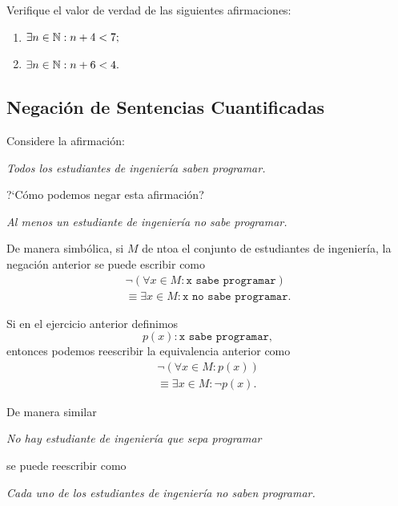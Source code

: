 \documentclass[xcolor={svgnames},
  hyperref={colorlinks}, 
  spanish, 12pt]{beamer}
\numberwithin{equation}{section} %
\numberwithin{figure}{section} %
\begin{document}
\begin{frame}
 Verifique el valor de verdad de las siguientes afirmaciones:
 \begin{enumerate}
  \item $\exists n  \in \mathbb{N}: n+4<7;$ \pause
  \item $\exists n \in \mathbb{N}: n+6<4.$
 \end{enumerate}

\end{frame}

\subsection{Negaci\'on de Sentencias Cuantificadas}


\begin{frame}
 Considere la afirmaci\'on:
 \begin{center}
  \emph{Todos los estudiantes de ingenier\'ia saben programar.}
 \end{center}
?`C\'omo podemos negar esta afirmaci\'on?
\pause

\begin{center}
 \emph{Al menos un estudiante de ingenier\'ia no sabe programar.}
\end{center} 
\end{frame}

\begin{frame}
 De manera simb\'olica, si $M$ de ntoa el conjunto de estudiantes de ingenier\'ia, la negaci\'on anterior se puede escribir como
\begin{align*}
  \neg\left( \forall x\in M: \texttt{x sabe programar} \right)\\ \equiv \exists x\in M: \texttt{x no sabe programar.}
\end{align*}

\end{frame}

\begin{frame}
 Si en el ejercicio anterior definimos $$p(x):\texttt{x sabe programar},$$ entonces podemos reescribir la equivalencia anterior como
 \begin{align*}
  \neg\left( \forall x\in M: p(x) \right)\\ \equiv \exists x\in M: \neg p(x).
\end{align*}
\end{frame}

\begin{frame}
 De manera similar
 \begin{center}
  \emph{No hay estudiante de ingenier\'ia que sepa programar}
 \end{center}
 se puede reescribir como
 \begin{center}
  \emph{Cada uno de los estudiantes de ingenier\'ia no saben programar.}
 \end{center}


\end{frame}
\end{document}

